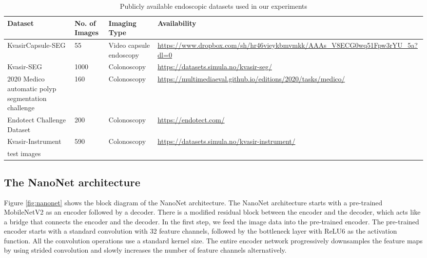 \documentclass[journal]{IEEEtran}
\begin{document}
\begin{table*} [!t]
 \caption{Publicly available endoscopic datasets used in our experiments}
    \label{table:datasettable}
\setlength{\tabcolsep}{6pt}
    \centering
    \begin{tabular}{p{4.5cm}|p{2cm}|p{3cm}|p{6cm}}
\toprule
        Dataset & No. of Images & Imaging Type &Availability \\ 
        \midrule
        KvasirCapsule-SEG &55 &  Video capsule endoscopy & \url{https://www.dropbox.com/sh/hr46vieykbmvmkk/AAAs_V8ECG0wq51Fpw3rYU_5a?dl=0} \\ 
        Kvasir-SEG~\cite{jha2020kvasir}& 1000 & Colonoscopy &\url{https://datasets.simula.no/kvasir-seg/}\\ 
        2020 Medico automatic polyp segmentation challenge~\cite{jha2020medico} & 160 &   Colonoscopy & \url{https://multimediaeval.github.io/editions/2020/tasks/medico/}\\  
        Endotect Challenge Dataset~\cite{hicksendotect} &200  &  Colonoscopy &\url{https://endotect.com/}\\  
      Kvasir-Instrument~\cite{bernal2015wm}& 590 & Colonoscopy &\url{https://datasets.simula.no/kvasir-instrument/}\\  
        \bottomrule
        \multicolumn{3}{l}{{test images}}
\end{tabular}
\end{table*}	
\subsection{The NanoNet architecture}
Figure \ref{fig:nanonet} shows the block diagram of the NanoNet architecture. The NanoNet architecture starts with a pre-trained MobileNetV2 as an encoder followed by a decoder. There is a modified residual block between the encoder and the decoder, which acts like a bridge that connects the encoder and the decoder. In the first step, we feed the image data into the pre-trained encoder. The pre-trained encoder starts with a standard convolution with 32 feature channels, followed by the bottleneck layer with ReLU6 as the activation function. All the convolution operations use a standard  kernel size. The entire encoder network progressively downsamples the feature maps by using strided convolution and slowly increases the number of feature channels alternatively.  
\end{document}

